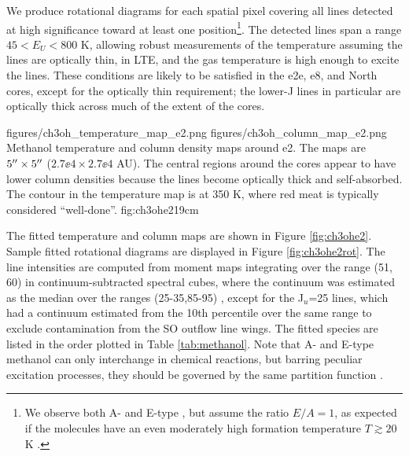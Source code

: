 \documentclass[twocolumn]{aastex61}
\begin{document}
We produce rotational diagrams for each spatial pixel covering all \methanol
lines detected at high significance toward at least one position\footnote{We
observe both A- and E-type \methanol, but assume the ratio $E/A=1$, 
as expected if the molecules have an even moderately high formation 
temperature $T\gtrsim20$ K \citep{Wirstrom2011a}.}.  The detected
lines span a range $45 < E_U < 800$ K, allowing robust measurements of the
temperature
assuming the lines are optically thin, in LTE, and the gas temperature is high
enough to excite the lines.  These conditions are likely to be satisfied in the
e2e, e8, and North cores, except for the optically thin requirement; the lower-J
lines in particular are optically thick across much of the extent of the cores. 

\FigureTwo
{figures/ch3oh_temperature_map_e2.png}
{figures/ch3oh_column_map_e2.png}
{Methanol temperature and column density maps around e2. 
The maps are $5\mbox{$^{\prime\prime}$}\times5\mbox{$^{\prime\prime}$}$ ($2.7\ee{4}\times2.7\ee{4}$ AU).
The central regions around
the cores appear to have lower column densities because the lines become
optically thick and self-absorbed.  The contour in the temperature map is at
350 K, where red meat is typically considered ``well-done''.}
{fig:ch3ohe2}{1}{9cm}

The fitted temperature and \methanol column maps are shown in Figure 
\ref{fig:ch3ohe2}.
Sample fitted rotational diagrams are displayed in Figure \ref{fig:ch3ohe2rot}.
The line intensities are computed from moment maps integrating over the range
(51, 60) \kms in continuum-subtracted spectral cubes, where the continuum
was estimated as the median over the ranges (25-35,85-95) \kms, except
for the J$_u$=25 lines, which had a continuum estimated from the 10th percentile
over the same range to exclude contamination from the SO outflow line wings.
The fitted species are listed in the order plotted in Table \ref{tab:methanol}.
Note that A- and E-type methanol can only interchange in chemical reactions,
but barring peculiar excitation processes, they should be governed by the same
partition function \citep{Rabli2010c}.
\end{document}
